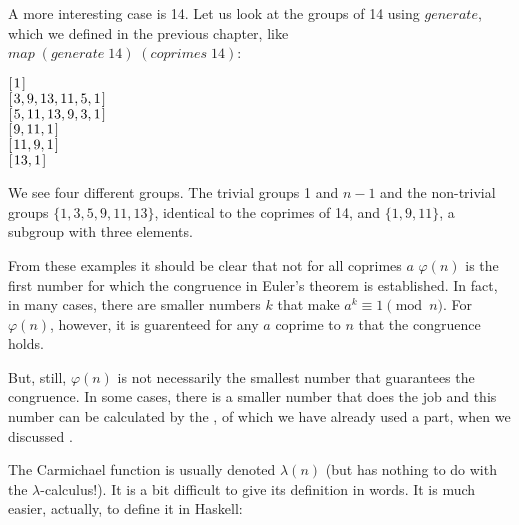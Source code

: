 \documentclass[tikz]{scrreprt}
\newcommand{\Varid}[1]{\mathit{#1}}
\begin{document}
A more interesting case is 14.
Let us look at the groups of 14 using \ensuremath{\Varid{generate}},
which we defined in the previous chapter,
like \ensuremath{\Varid{map}\;(\Varid{generate}\;\mathrm{14})\;(\Varid{coprimes}\;\mathrm{14})}:

\ensuremath{[\mskip1.5mu \mathrm{1}\mskip1.5mu]}\\
\ensuremath{[\mskip1.5mu \mathrm{3},\mathrm{9},\mathrm{13},\mathrm{11},\mathrm{5},\mathrm{1}\mskip1.5mu]}\\
\ensuremath{[\mskip1.5mu \mathrm{5},\mathrm{11},\mathrm{13},\mathrm{9},\mathrm{3},\mathrm{1}\mskip1.5mu]}\\
\ensuremath{[\mskip1.5mu \mathrm{9},\mathrm{11},\mathrm{1}\mskip1.5mu]}\\
\ensuremath{[\mskip1.5mu \mathrm{11},\mathrm{9},\mathrm{1}\mskip1.5mu]}\\
\ensuremath{[\mskip1.5mu \mathrm{13},\mathrm{1}\mskip1.5mu]}

We see four different groups.
The trivial groups 1 and $n-1$ and
the non-trivial groups $\lbrace 1,3,5,9,11,13\rbrace$,
identical to the coprimes of 14, and 
$\lbrace 1,9,11\rbrace$, a subgroup
with three elements.

From these examples it should be clear
that not for all coprimes $a$ $\varphi(n)$
is the first number for which the congruence
in Euler's theorem is established.
In fact, in many cases, there are smaller numbers $k$
that make $a^k \equiv 1 \pmod{n}$.
For $\varphi(n)$, however, it is guarenteed
for any $a$ coprime to $n$ that the congruence
holds.

But, still, $\varphi(n)$ is not necessarily
the smallest number that guarantees 
the congruence.
In some cases, there is a smaller number
that does the job and this number
can be calculated by the ,
of which we have already used a part,
when we discussed .

The Carmichael function is usually denoted
$\lambda(n)$ (but has nothing to do with
the $\lambda$-calculus!).
It is a bit difficult to give its definition
in words. It is much easier, actually,
to define it in Haskell:
\end{document}
